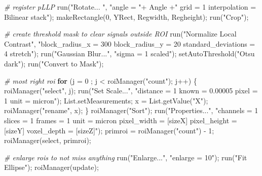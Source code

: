 \documentclass[10pt, b5paper, singlespacinge, twoside]{reedthesis} %
\newenvironment{Shaded}{}{}
\newcommand{\AttributeTok}[1]{#1}
\newcommand{\CommentTok}[1]{\textit{#1}}
\newcommand{\ControlFlowTok}[1]{\textbf{#1}}
\newcommand{\DecValTok}[1]{#1}
\newcommand{\FunctionTok}[1]{#1}
\newcommand{\NormalTok}[1]{#1}
\newcommand{\OtherTok}[1]{#1}
\newcommand{\SpecialCharTok}[1]{#1}
\newcommand{\StringTok}[1]{#1}
\theoremstyle{definition}
\theoremstyle{definition}
\theoremstyle{definition}
\theoremstyle{remark}
\begin{document}
\scriptsize
\begin{Shaded}
\begin{Highlighting}[numbers=left,,]
\CommentTok{\# register pLLP}
    \FunctionTok{run}\NormalTok{(}\StringTok{"Rotate... "}\NormalTok{, }\StringTok{"angle = "}\SpecialCharTok{+}\NormalTok{ Angle }\SpecialCharTok{+}\StringTok{" grid = 1 interpolation = Bilinear stack"}\NormalTok{);}
    \FunctionTok{makeRectangle}\NormalTok{(}\DecValTok{0}\NormalTok{, YRect, Regwidth, Regheight);}
    \FunctionTok{run}\NormalTok{(}\StringTok{"Crop"}\NormalTok{);}

\CommentTok{\# create threshold mask to clear signals outside ROI}
    \FunctionTok{run}\NormalTok{(}\StringTok{"Normalize Local Contrast"}\NormalTok{, }\StringTok{"block\_radius\_x = 300 block\_radius\_y = 20 standard\_deviations = 4 stretch"}\NormalTok{);}
    \FunctionTok{run}\NormalTok{(}\StringTok{"Gaussian Blur..."}\NormalTok{, }\StringTok{"sigma = 1 scaled"}\NormalTok{);}
    \FunctionTok{setAutoThreshold}\NormalTok{(}\StringTok{"Otsu dark"}\NormalTok{);}
    \FunctionTok{run}\NormalTok{(}\StringTok{"Convert to Mask"}\NormalTok{);}

\CommentTok{\# most right roi}
    \ControlFlowTok{for}\NormalTok{ (}\AttributeTok{j =} \DecValTok{0}\NormalTok{ ; j }\SpecialCharTok{\textless{}} \FunctionTok{roiManager}\NormalTok{(}\StringTok{"count"}\NormalTok{); j}\SpecialCharTok{++}\NormalTok{) \{}
        \FunctionTok{roiManager}\NormalTok{(}\StringTok{"select"}\NormalTok{, j);}
        \FunctionTok{run}\NormalTok{(}\StringTok{"Set Scale..."}\NormalTok{, }\StringTok{"distance = 1 known = 0.00005 pixel = 1 unit = micron"}\NormalTok{);}
\NormalTok{        List.setMeasurements;}
\NormalTok{    x }\OtherTok{=} \FunctionTok{List.getValue}\NormalTok{(}\StringTok{"X"}\NormalTok{);}
    \FunctionTok{roiManager}\NormalTok{(}\StringTok{"rename"}\NormalTok{, x);}
\NormalTok{    \}}
    \FunctionTok{roiManager}\NormalTok{(}\StringTok{"Sort"}\NormalTok{);}
    \FunctionTok{run}\NormalTok{(}\StringTok{"Properties..."}\NormalTok{, }
        \StringTok{"channels = 1 slices = 1 frames = 1 unit = micron pixel\_width = [sizeX] pixel\_height = [sizeY] voxel\_depth = [sizeZ]"}\NormalTok{);}
\NormalTok{    primroi }\OtherTok{=} \FunctionTok{roiManager}\NormalTok{(}\StringTok{"count"}\NormalTok{) }\SpecialCharTok{{-}} \DecValTok{1}\NormalTok{;}
    \FunctionTok{roiManager}\NormalTok{(}\StringTok{\textquotesingle{}select\textquotesingle{}}\NormalTok{, primroi);}
    
\CommentTok{\# enlarge rois to not miss anything}
    \FunctionTok{run}\NormalTok{(}\StringTok{"Enlarge..."}\NormalTok{, }\StringTok{"enlarge = 10"}\NormalTok{);}
    \FunctionTok{run}\NormalTok{(}\StringTok{"Fit Ellipse"}\NormalTok{);}
    \FunctionTok{roiManager}\NormalTok{(}\StringTok{\textquotesingle{}update\textquotesingle{}}\NormalTok{);}
\end{Highlighting}
\end{Shaded}
\normalsize
\end{document}

